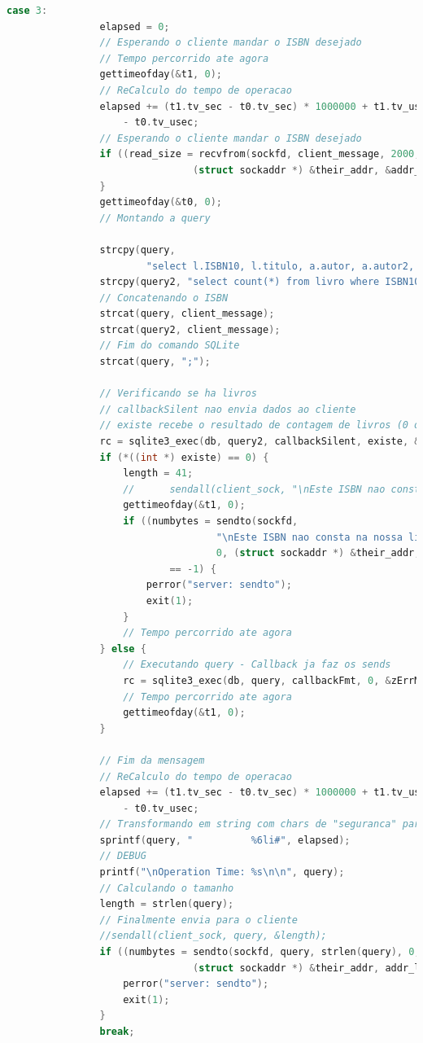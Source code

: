 \documentclass[10pt,a4paper]{report}
\begin{document}
\begin{lstlisting}[language=C]
case 3:
				elapsed = 0;
				// Esperando o cliente mandar o ISBN desejado
				// Tempo percorrido ate agora
				gettimeofday(&t1, 0);
				// ReCalculo do tempo de operacao
				elapsed += (t1.tv_sec - t0.tv_sec) * 1000000 + t1.tv_usec
					- t0.tv_usec;
				// Esperando o cliente mandar o ISBN desejado
				if ((read_size = recvfrom(sockfd, client_message, 2000, 0,
								(struct sockaddr *) &their_addr, &addr_len)) == -1) {
				}
				gettimeofday(&t0, 0);
				// Montando a query

				strcpy(query,
						"select l.ISBN10, l.titulo, a.autor, a.autor2, a.autor3, a.autor4, l.descricao, l.editora, l.ano, l.estoque from livro l, autor a where l.autores=a.a_id and ISBN10 = ");
				strcpy(query2, "select count(*) from livro where ISBN10 = ");
				// Concatenando o ISBN
				strcat(query, client_message);
				strcat(query2, client_message);
				// Fim do comando SQLite
				strcat(query, ";");

				// Verificando se ha livros
				// callbackSilent nao envia dados ao cliente
				// existe recebe o resultado de contagem de livros (0 ou 1)
				rc = sqlite3_exec(db, query2, callbackSilent, existe, &zErrMsg);
				if (*((int *) existe) == 0) {
					length = 41;
					//		sendall(client_sock, "\nEste ISBN nao consta na nossa livraria!\n",&length);
					gettimeofday(&t1, 0);
					if ((numbytes = sendto(sockfd,
									"\nEste ISBN nao consta na nossa livraria!\n", 42,
									0, (struct sockaddr *) &their_addr, addr_len))
							== -1) {
						perror("server: sendto");
						exit(1);
					}
					// Tempo percorrido ate agora
				} else {
					// Executando query - Callback ja faz os sends
					rc = sqlite3_exec(db, query, callbackFmt, 0, &zErrMsg);
					// Tempo percorrido ate agora
					gettimeofday(&t1, 0);
				}

				// Fim da mensagem
				// ReCalculo do tempo de operacao
				elapsed += (t1.tv_sec - t0.tv_sec) * 1000000 + t1.tv_usec
					- t0.tv_usec;
				// Transformando em string com chars de "seguranca" para postumo atoi
				sprintf(query, "          %6li#", elapsed);
				// DEBUG
				printf("\nOperation Time: %s\n\n", query);
				// Calculando o tamanho
				length = strlen(query);
				// Finalmente envia para o cliente
				//sendall(client_sock, query, &length);
				if ((numbytes = sendto(sockfd, query, strlen(query), 0,
								(struct sockaddr *) &their_addr, addr_len)) == -1) {
					perror("server: sendto");
					exit(1);
				}
				break;
\end{lstlisting}
\end{document}
